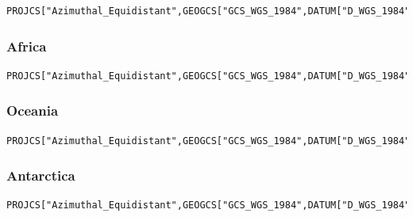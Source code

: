 \documentclass[10pt,a4paper]{article}
\begin{document}
\begin{lstlisting}
PROJCS["Azimuthal_Equidistant",GEOGCS["GCS_WGS_1984",DATUM["D_WGS_1984",SPHEROID["WGS_1984",6378137.0,298.257223563]],PRIMEM["Greenwich",0.0],UNIT["Degree",0.0174532925199433]],PROJECTION["Azimuthal_Equidistant"],PARAMETER["false_easting",7257179.23559],PARAMETER["false_northing",5592024.44605],PARAMETER["central_meridian",-60.5],PARAMETER["latitude_of_origin",-14.0],UNIT["Meter",1.0]]
\end{lstlisting}

\newpage

\subsubsection*{Africa}

\begin{lstlisting}
PROJCS["Azimuthal_Equidistant",GEOGCS["GCS_WGS_1984",DATUM["D_WGS_1984",SPHEROID["WGS_1984",6378137.0,298.257223563]],PRIMEM["Greenwich",0.0],UNIT["Degree",0.0174532925199433]],PROJECTION["Azimuthal_Equidistant"],PARAMETER["false_easting",5621452.01998],PARAMETER["false_northing",5990638.42298],PARAMETER["central_meridian",21.5],PARAMETER["latitude_of_origin",8.5],UNIT["Meter",1.0]]
\end{lstlisting}

\subsubsection*{Oceania}

\begin{lstlisting}
PROJCS["Azimuthal_Equidistant",GEOGCS["GCS_WGS_1984",DATUM["D_WGS_1984",SPHEROID["WGS_1984",6378137.0,298.257223563]],PRIMEM["Greenwich",0.0],UNIT["Degree",0.0174532925199433]],PROJECTION["Azimuthal_Equidistant"],PARAMETER["false_easting",5621452.01998],PARAMETER["false_northing",5990638.42298],PARAMETER["central_meridian",21.5],PARAMETER["latitude_of_origin",8.5],UNIT["Meter",1.0]]
\end{lstlisting}

\subsubsection*{Antarctica}

\begin{lstlisting}
PROJCS["Azimuthal_Equidistant",GEOGCS["GCS_WGS_1984",DATUM["D_WGS_1984",SPHEROID["WGS_1984",6378137.0,298.257223563]],PRIMEM["Greenwich",0.0],UNIT["Degree",0.0174532925199433]],PROJECTION["Azimuthal_Equidistant"],PARAMETER["false_easting",3714266.97719],PARAMETER["false_northing",3402016.50625],PARAMETER["central_meridian",0.0],PARAMETER["latitude_of_origin",-90.0],UNIT["Meter",1.0]]
\end{lstlisting}
\end{document}
